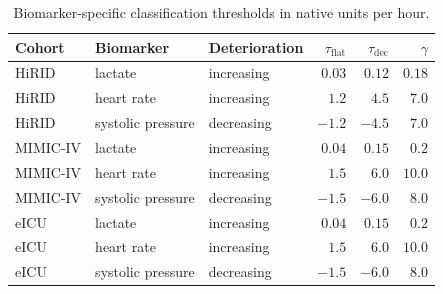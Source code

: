 \begin{table}[t]
\centering
\caption{Biomarker-specific classification thresholds in native units per hour.}
\label{tab:traj-thresholds}
\begin{tabular}{lllrrr}
\toprule
Cohort & Biomarker & Deterioration & $\tau_{\mathrm{flat}}$ & $\tau_{\mathrm{dec}}$ & $\gamma$ \\
\midrule
HiRID & lactate & increasing & $0.03$ & $0.12$ & $0.18$ \\
HiRID & heart rate & increasing & $1.2$ & $4.5$ & $7.0$ \\
HiRID & systolic pressure & decreasing & $-1.2$ & $-4.5$ & $7.0$ \\
\midrule
MIMIC-IV & lactate & increasing & $0.04$ & $0.15$ & $0.2$ \\
MIMIC-IV & heart rate & increasing & $1.5$ & $6.0$ & $10.0$ \\
MIMIC-IV & systolic pressure & decreasing & $-1.5$ & $-6.0$ & $8.0$ \\
\midrule
eICU & lactate & increasing & $0.04$ & $0.15$ & $0.2$ \\
eICU & heart rate & increasing & $1.5$ & $6.0$ & $10.0$ \\
eICU & systolic pressure & decreasing & $-1.5$ & $-6.0$ & $8.0$ \\
\bottomrule
\end{tabular}
\end{table}
